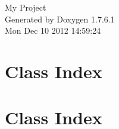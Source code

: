 \documentclass[a4paper]{book}
\begin{document}
\hypersetup{pageanchor=false,citecolor=blue}
\begin{titlepage}
\vspace*{7cm}
\begin{center}
{\Large \-My \-Project }\\
\vspace*{1cm}
{\large \-Generated by Doxygen 1.7.6.1}\\
\vspace*{0.5cm}
{\small Mon Dec 10 2012 14:59:24}\\
\end{center}
\end{titlepage}
\clearemptydoublepage
{}
\tableofcontents
\clearemptydoublepage
{}
\hypersetup{pageanchor=true,citecolor=blue}
\chapter{\-Class \-Index}

\chapter{\-Class \-Index}

\end{document}
